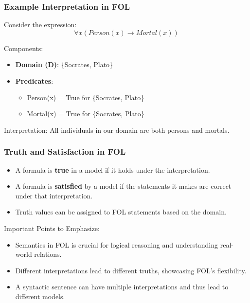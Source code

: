\documentclass[aspectratio=169]{beamer}
\begin{document}
\begin{frame}[fragile]
    \frametitle{Example Interpretation in FOL}
    Consider the expression:
    \begin{equation}
    \forall x (Person(x) \rightarrow Mortal(x))
    \end{equation}
    
    Components:
    \begin{itemize}
        \item \textbf{Domain (D)}: \{Socrates, Plato\}
        \item \textbf{Predicates}:
        \begin{itemize}
            \item Person(x) = True for \{Socrates, Plato\}
            \item Mortal(x) = True for \{Socrates, Plato\}
        \end{itemize}
    \end{itemize}
    
    Interpretation:
    All individuals in our domain are both persons and mortals.
\end{frame}

\begin{frame}[fragile]
    \frametitle{Truth and Satisfaction in FOL}
    \begin{itemize}
        \item A formula is \textbf{true} in a model if it holds under the interpretation.
        \item A formula is \textbf{satisfied} by a model if the statements it makes are correct under that interpretation.
        \item Truth values can be assigned to FOL statements based on the domain. 
    \end{itemize}
    
    Important Points to Emphasize:
    \begin{itemize}
        \item Semantics in FOL is crucial for logical reasoning and understanding real-world relations.
        \item Different interpretations lead to different truths, showcasing FOL's flexibility.
        \item A syntactic sentence can have multiple interpretations and thus lead to different models.
    \end{itemize}
\end{frame}
\end{document}

